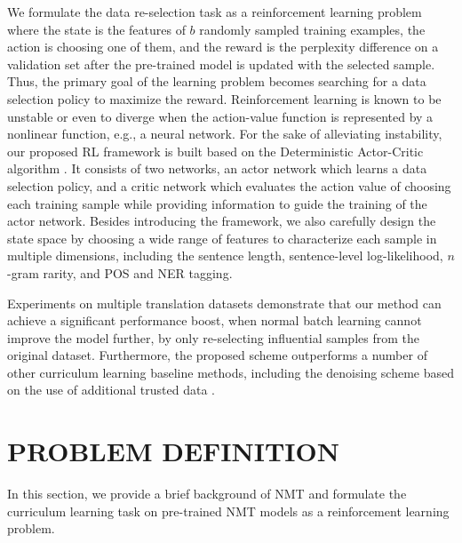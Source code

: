 \documentclass[letterpaper]{article}
\begin{document}
We formulate the data re-selection task as a reinforcement learning problem where the state is the features of $b$ randomly sampled training examples, the action is choosing one of them, and the reward is the perplexity difference on a validation set after the pre-trained model is updated with the selected sample. Thus, the primary goal of the learning problem becomes searching for a data selection policy to maximize the reward. Reinforcement learning is known to be unstable or even to diverge when the action-value function is represented by a nonlinear function, e.g., a neural network. For the sake of alleviating instability, our proposed RL framework is built based on the Deterministic Actor-Critic algorithm \cite{silver2014deterministic}. It consists of two networks, an actor network which learns a data selection policy, and a critic network which evaluates the action value of choosing each training sample while providing information to guide the training of the actor network. Besides introducing the framework, we also carefully design the state space by choosing a wide range of features to characterize each sample in multiple dimensions, including the sentence length, sentence-level log-likelihood, $n$-gram rarity, and POS and NER tagging. 

Experiments on multiple translation datasets demonstrate that our method can achieve a significant performance boost, when normal batch learning cannot improve the model further, by only re-selecting influential samples from the original dataset. Furthermore, the proposed scheme outperforms a number of other curriculum learning baseline methods, including the denoising scheme based on the use of additional trusted data \cite{wang2018denoising}.

\section{PROBLEM DEFINITION}
\label{sec:prob}

In this section, we provide a brief background of NMT and formulate the curriculum learning task on pre-trained NMT models as a reinforcement learning problem.
\end{document}
